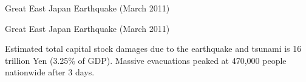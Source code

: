 \documentclass[serif, aspectratio=169]{beamer}
\begin{document}
\begin{frame}{Great East Japan Earthquake (March 2011)}
\begin{minipage}{1.00\textwidth}
\begin{figure}[h!]
    \end{figure}
    
    \end{minipage}
\end{frame}


\begin{frame}{Great East Japan Earthquake (March 2011)}
    \begin{minipage}{1.00\textwidth}
    \raggedright
    \begin{flushleft}
\begin{table}[h!]
\vspace{-0.7cm}
\raggedright
Estimated total capital stock damages due to the earthquake and tsunami is 16 trillion Yen (3.25\% of GDP). Massive evacuations peaked at 470,000 people nationwide after 3 days.



\end{table}
\end{flushleft}
\end{minipage}
\end{frame}
\end{document}
